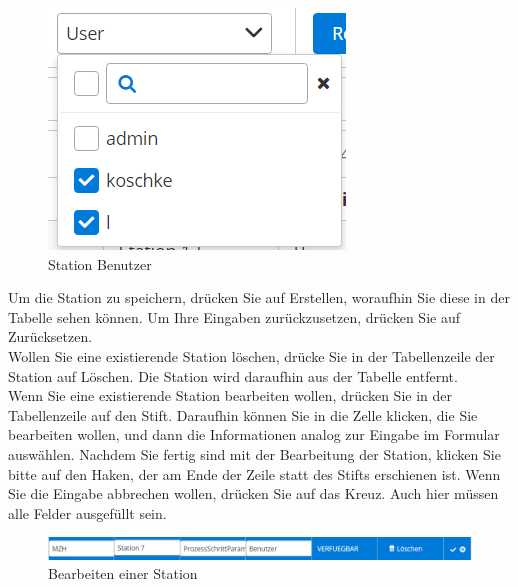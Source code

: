 \documentclass[enabledeprecatedfontcommands,fontsize=12pt,paper=a4,twoside]{scrartcl}
\begin{document}
\begin{figure}[h!]
\begin{center}
 \includegraphics[width=\textwidth]{screenshots/admin/stationuser.png}
  \caption{Station Benutzer}
  \label{fig:boat2}
\end{center}
\end{figure}

Um die Station zu speichern, drücken Sie auf Erstellen, woraufhin Sie diese in der Tabelle sehen können. Um Ihre Eingaben zurückzusetzen, drücken Sie auf Zurücksetzen. \\


Wollen Sie eine existierende Station löschen, drücke Sie in der Tabellenzeile der Station auf Löschen. Die Station wird daraufhin aus der Tabelle entfernt. \\
Wenn Sie eine existierende Station bearbeiten wollen, drücken Sie in der Tabellenzeile auf den Stift. Daraufhin können Sie in die Zelle klicken, die Sie bearbeiten wollen, und dann die Informationen analog zur Eingabe im Formular auswählen. Nachdem Sie fertig sind mit der Bearbeitung der Station, klicken Sie bitte auf den Haken, der am Ende der Zeile statt des Stifts erschienen ist. Wenn Sie die Eingabe abbrechen wollen, drücken Sie auf das Kreuz. Auch hier müssen alle Felder ausgefüllt sein. \\

\begin{figure}[h!]
\begin{center}
 \includegraphics[width=\textwidth]{screenshots/admin/stationbearbeiten.png}
  \caption{Bearbeiten einer Station}
  \label{fig:boat2}
\end{center}
\end{figure}
\end{document}
